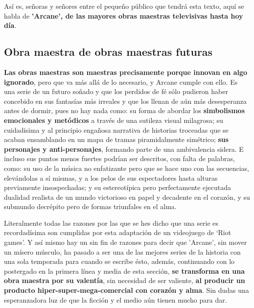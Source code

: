 \documentclass[11pt,A5]{article}
\begin{document}
Así es, señoras y señores entre el pequeño público que tendrá esta texto, aquí se habla de {\textbf{'Arcane', de las mayores obras maestras televisivas hasta hoy día}}.

    \subsection*{{\large{\textsf{\hspace{1cm}Obra maestra de obras maestras futuras}}}}

{\textbf{Las obras maestras son maestras precisamente porque innovan en algo ignorado}}, pero que va más allá de lo necesario, y Arcane cumple con ello. Es una serie de un futuro soñado y que los perdidos de fé sólo pudieron haber concebido en sus fantasías más irreales y que los llenan de aún más desesperanza antes de dormir, pues no hay nada como: su forma de abordar los {\textbf{simbolismos emocionales y metódicos}} a través de una sutileza visual milagrosa; su cuidadisima y al principio engañosa narrativa de historias troceadas que se acaban ensamblando en un mapa de tramas piramidalmente simétrico; {\textbf{sus personajes y anti-personajes}}, formando parte de una ambivalencia sidera. E incluso sus puntos menos fuertes podrían ser descritos, con falta de palabras, como: su uso de la música no enfatizante pero que se hace uno con las secuencias, elevándolas a sí mismas,  y a los pelos de sus espectadores hasta alturas previamente insospechadas; y su estereotípica pero perfectamente ejecutada dualidad realista de un mundo victorioso en papel y decadente en el corazón, y su submundo decrépito pero de formas triunfales en el alma.\newline

Literalmente todas las razones por las que se hes dicho que una serie es recordadísima son cumplidas por esta adaptación de un videojuego de ‘Riot games’. Y así mismo hay un sin fin de razones para decir que 'Arcane', sin mover un mísero músculo, ha pasado a ser una de las mejores series de la historia con una sola temporada para cuando se escribe ésto, además, continuando con lo postergado en la primera línea y media de esta sección, {\textbf{se transforma en una obra maestra por su valentía}}, sin necesidad de ser valiente, {\textbf{al producir un producto hiper-super-mega-comercial con corazón y alma}}. Sin dudas una esperanzadora luz de que la ficción y el medio aún tienen mucho para dar.\newline
\end{document}

